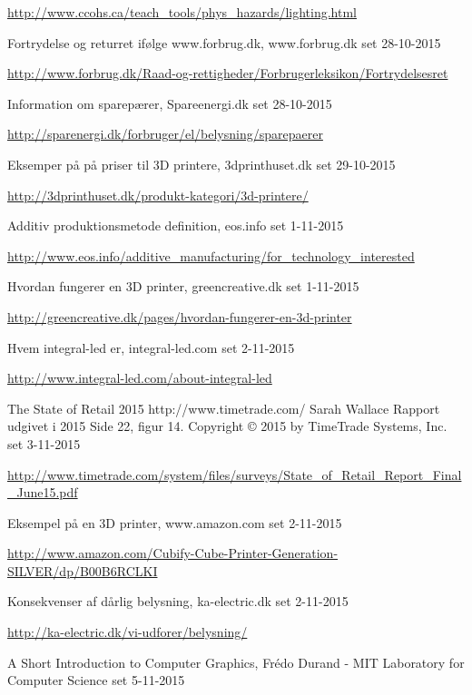 \begin{thebibliography}{99}
  \url{http://www.ccohs.ca/teach_tools/phys_hazards/lighting.html}
  
  Fortrydelse og returret ifølge www.forbrug.dk,
  www.forbrug.dk
  set 28-10-2015
  
  \url{http://www.forbrug.dk/Raad-og-rettigheder/Forbrugerleksikon/Fortrydelsesret}
  
  Information om sparepærer,
  Spareenergi.dk
  set 28-10-2015
  
  \url{http://sparenergi.dk/forbruger/el/belysning/sparepaerer}

  Eksemper på på priser til 3D printere,
  3dprinthuset.dk
  set 29-10-2015
  
  \url{http://3dprinthuset.dk/produkt-kategori/3d-printere/}

  Additiv produktionsmetode definition,
  eos.info
  set 1-11-2015
  
  \url{http://www.eos.info/additive_manufacturing/for_technology_interested}
  
  Hvordan fungerer en 3D printer,
  greencreative.dk
  set 1-11-2015
  
  \url{http://greencreative.dk/pages/hvordan-fungerer-en-3d-printer}

  Hvem integral-led er,
  integral-led.com
  set 2-11-2015
  
  \url{http://www.integral-led.com/about-integral-led}
  
  The State of Retail 2015
  http://www.timetrade.com/
  Sarah Wallace
  Rapport udgivet i 2015
  Side 22, figur 14.
  Copyright © 2015 by TimeTrade Systems, Inc.
  set 3-11-2015
  
  \url{http://www.timetrade.com/system/files/surveys/State_of_Retail_Report_Final_June15.pdf}
  
  Eksempel på en 3D printer,
  www.amazon.com
  set 2-11-2015
  
  \url{http://www.amazon.com/Cubify-Cube-Printer-Generation-SILVER/dp/B00B6RCLKI}

  Konsekvenser af dårlig belysning,
  ka-electric.dk
  set 2-11-2015

  \url{http://ka-electric.dk/vi-udforer/belysning/}

  A Short Introduction to Computer Graphics,
  Frédo Durand - MIT Laboratory for Computer Science
  set 5-11-2015


\end{thebibliography}
